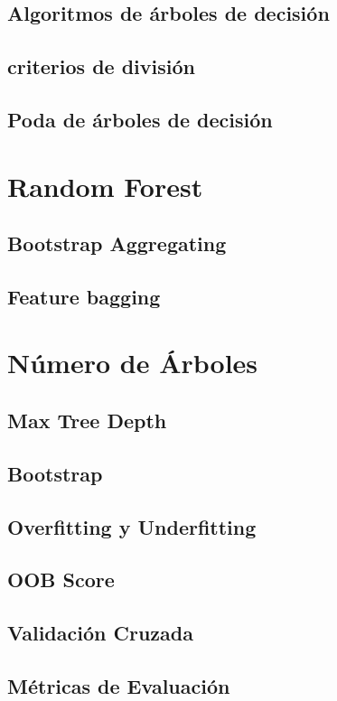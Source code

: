 		\subsection{Algoritmos de árboles de decisión}
		\subsection{criterios de división}
		\subsection{Poda de árboles de decisión}
	\section{Random Forest}
		\subsection{Bootstrap Aggregating}
		\subsection{Feature bagging}
	\section{Número de Árboles}
		\subsection{Max Tree Depth}
		\subsection{Bootstrap}
		\subsection{Overfitting y Underfitting}
		\subsection{OOB Score}
		\subsection{Validación Cruzada}
		\subsection{Métricas de Evaluación}
		
			
		